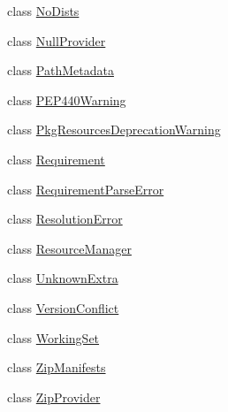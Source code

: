 \begin{DoxyCompactItemize}
\item 
class \hyperlink{classpip_1_1__vendor_1_1pkg__resources_1_1NoDists}{No\+Dists}
\item 
class \hyperlink{classpip_1_1__vendor_1_1pkg__resources_1_1NullProvider}{Null\+Provider}
\item 
class \hyperlink{classpip_1_1__vendor_1_1pkg__resources_1_1PathMetadata}{Path\+Metadata}
\item 
class \hyperlink{classpip_1_1__vendor_1_1pkg__resources_1_1PEP440Warning}{P\+E\+P440\+Warning}
\item 
class \hyperlink{classpip_1_1__vendor_1_1pkg__resources_1_1PkgResourcesDeprecationWarning}{Pkg\+Resources\+Deprecation\+Warning}
\item 
class \hyperlink{classpip_1_1__vendor_1_1pkg__resources_1_1Requirement}{Requirement}
\item 
class \hyperlink{classpip_1_1__vendor_1_1pkg__resources_1_1RequirementParseError}{Requirement\+Parse\+Error}
\item 
class \hyperlink{classpip_1_1__vendor_1_1pkg__resources_1_1ResolutionError}{Resolution\+Error}
\item 
class \hyperlink{classpip_1_1__vendor_1_1pkg__resources_1_1ResourceManager}{Resource\+Manager}
\item 
class \hyperlink{classpip_1_1__vendor_1_1pkg__resources_1_1UnknownExtra}{Unknown\+Extra}
\item 
class \hyperlink{classpip_1_1__vendor_1_1pkg__resources_1_1VersionConflict}{Version\+Conflict}
\item 
class \hyperlink{classpip_1_1__vendor_1_1pkg__resources_1_1WorkingSet}{Working\+Set}
\item 
class \hyperlink{classpip_1_1__vendor_1_1pkg__resources_1_1ZipManifests}{Zip\+Manifests}
\item 
class \hyperlink{classpip_1_1__vendor_1_1pkg__resources_1_1ZipProvider}{Zip\+Provider}
\end{DoxyCompactItemize}
